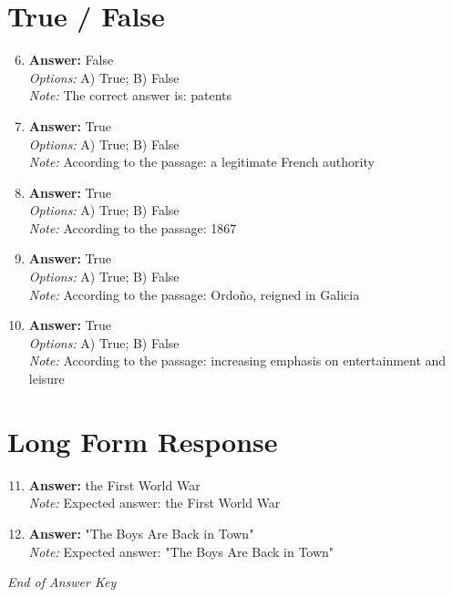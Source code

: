 \documentclass[12pt]{article}
\begin{document}
\section*{True / False}
\begin{enumerate}[label=\arabic*.]
\setcounter{enumi}{5}
\item \textbf{Answer:} False
\\ \textit{Options:} A) True; B) False
\\ \textit{Note:} The correct answer is: patents
\item \textbf{Answer:} True
\\ \textit{Options:} A) True; B) False
\\ \textit{Note:} According to the passage: a legitimate French authority
\item \textbf{Answer:} True
\\ \textit{Options:} A) True; B) False
\\ \textit{Note:} According to the passage: 1867
\item \textbf{Answer:} True
\\ \textit{Options:} A) True; B) False
\\ \textit{Note:} According to the passage: Ordoño, reigned in Galicia
\item \textbf{Answer:} True
\\ \textit{Options:} A) True; B) False
\\ \textit{Note:} According to the passage: increasing emphasis on entertainment and leisure
\end{enumerate}

\section*{Long Form Response}
\begin{enumerate}[label=\arabic*.]
\setcounter{enumi}{10}
\item \textbf{Answer:} the First World War
\\ \textit{Note:} Expected answer: the First World War
\item \textbf{Answer:} "The Boys Are Back in Town"
\\ \textit{Note:} Expected answer: "The Boys Are Back in Town"
\end{enumerate}

\vfill
\noindent\textit{End of Answer Key}
\end{document}
